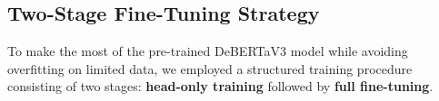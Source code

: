 
\subsection{Two-Stage Fine-Tuning Strategy}

To make the most of the pre-trained \ac{DeBERTaV3} model while avoiding overfitting on limited data, we employed a structured training procedure consisting of two stages: \textbf{head-only training} followed by \textbf{full fine-tuning}.

